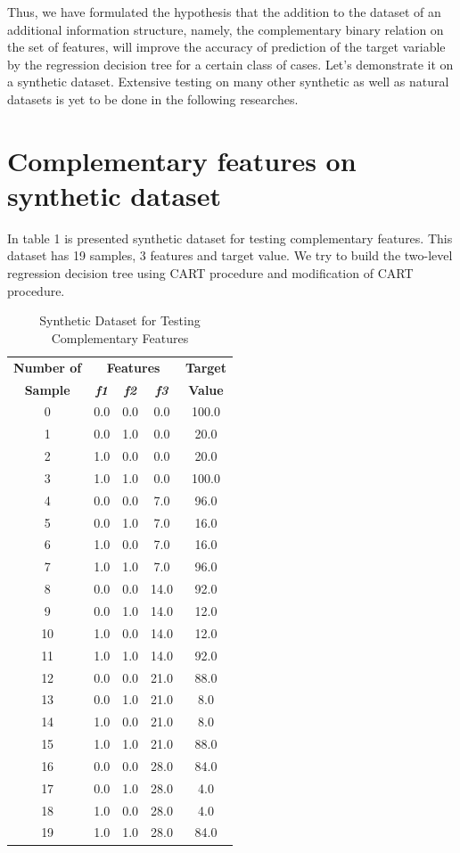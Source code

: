 \documentclass[conference]{IEEEtran}
\theoremstyle{definition}
\begin{document}
Thus, we have formulated the hypothesis that the addition to the dataset of an additional information structure, namely, the complementary binary relation on the set of features, will improve the accuracy of prediction of the target variable by the regression decision tree for a certain class of cases. Let's demonstrate it on a synthetic dataset. Extensive testing on many other synthetic as well as natural datasets is yet to be done in the following researches.

\section{Complementary features on synthetic dataset}

In table 1 is presented synthetic dataset for testing complementary features. This dataset has 19 samples, 3 features and target value. We try to build the two-level regression decision tree using CART procedure and modification of CART procedure. 

\begin{table}[htbp]
\caption{Synthetic Dataset for Testing Complementary Features}
\begin{center}
\begin{tabular}{|c|c|c|c|c|}
\hline
\textbf{Number of}&\multicolumn{3}{|c|}{\textbf{Features}}& \textbf{Target} \\
\cline{2-4} 
\textbf{Sample} & \textbf{\textit{f1}}& \textbf{\textit{f2}}& \textbf{\textit{f3}}& \textbf{Value} \\
\hline
0&	0.0&	0.0&	0.0&	100.0 \\
\hline
1&	0.0&	1.0&	0.0&	20.0  \\
\hline
2&	1.0&	0.0&	0.0&	20.0  \\
\hline
3&	1.0&	1.0&	0.0&	100.0 \\
\hline
4&	0.0&	0.0&	7.0&	96.0  \\
\hline
5&	0.0&	1.0&	7.0&	16.0  \\
\hline
6&	1.0&	0.0&	7.0&	16.0  \\
\hline
7&	1.0&	1.0&	7.0&	96.0  \\
\hline
8&	0.0&	0.0&	14.0&	92.0  \\
\hline
9&	0.0&	1.0&	14.0&	12.0  \\
\hline
10&	1.0&	0.0&	14.0&	12.0  \\
\hline
11&	1.0&	1.0&	14.0&	92.0  \\
\hline
12&	0.0&	0.0&	21.0&	88.0  \\
\hline
13&	0.0&	1.0&	21.0&	8.0   \\
\hline
14&	1.0&	0.0&	21.0&	8.0   \\
\hline
15&	1.0&	1.0&	21.0&	88.0  \\
\hline
16&	0.0&	0.0&	28.0&	84.0  \\
\hline
17&	0.0&	1.0&	28.0&	4.0   \\
\hline
18&	1.0&	0.0&	28.0&	4.0   \\
\hline
19&	1.0&	1.0&	28.0&	84.0  \\
\hline
\end{tabular}
\label{tab1}
\end{center}
\end{table}
\end{document}
